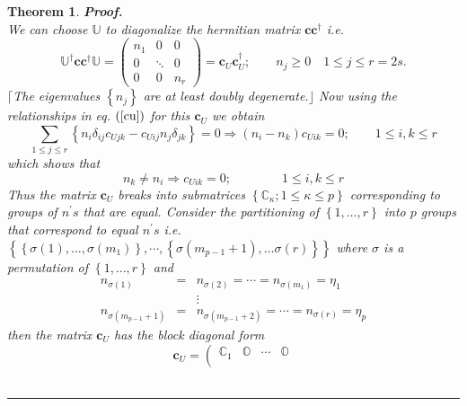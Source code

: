 \documentclass[aps,preprint]{revtex4}
\newtheorem{theorem}{Theorem}
\newenvironment{proof}[1][Proof]{\noindent\textbf{#1.} }{\ \rule{0.5em}{0.5em}}
\begin{document}
\begin{theorem}
\begin{proof}
\begin{equation}
\end{equation}%
We can choose $\mathbb{U}$ to diagonalize the hermitian matrix $\mathbf{cc}%
^{\dagger }$ i.e.%
\begin{equation}
\mathbb{U}^{\dagger }\mathbf{cc}\mathbb{^{\dagger }U}=\left( 
\begin{array}{ccc}
n_{1} & 0 & 0 \\ 
0 & \ddots & 0 \\ 
0 & 0 & n_{r}%
\end{array}%
\right) =\mathbf{c}_{U}\mathbf{c}_{U}^{\dagger };\qquad n_{j}\geq 0\quad
1\leq j\leq r=2s.
\end{equation}%
$\lceil $The eigenvalues $\left\{ n_{j}\right\} $ are at least doubly
degenerate.$\rfloor $ Now using the relationships in eq. $\left( \ref{cu}%
\right) $ for this $\mathbf{c}_{U}$ we obtain%
\begin{equation}
\sum_{1\leq j\leq r}\left\{ n_{i}\delta _{ij}c_{Ujk}-c_{Uij}n_{j}\delta
_{jk}\right\} =0\Rightarrow \left( n_{i}-n_{k}\right) c_{Uik}=0;\qquad 1\leq
i,k\leq r
\end{equation}%
which shows that 
\begin{equation}
n_{k}\neq n_{i}\Rightarrow c_{Uik}=0;\qquad \qquad 1\leq i,k\leq r
\end{equation}%
Thus the matrix $\mathbf{c}_{U}$ breaks into submatrices $\left\{ \mathbb{C}%
_{\kappa };1\leq \kappa \leq p\right\} $ corresponding to groups of $%
n^{\prime }s$ that are equal. Consider the partitioning of $\left\{ 1,\ldots
,r\right\} $ into $p$ groups that correspond to equal $n^{\prime }s$ i.e. $%
\left\{ \left\{ \sigma \left( 1\right) ,\ldots ,\sigma \left( m_{1}\right)
\right\} ,\cdots ,\left\{ \sigma \left( m_{p-1}+1\right) ,\ldots \sigma
\left( r\right) \right\} \right\} $ where $\sigma $ is a permutation of $%
\left\{ 1,\ldots ,r\right\} $ and 
\begin{eqnarray}
n_{\sigma \left( 1\right) } &=&n_{\sigma \left( 2\right) }=\cdots =n_{\sigma
\left( m_{1}\right) }=\eta _{1}  \nonumber \\
&&\vdots  \nonumber \\
n_{\sigma \left( m_{p-1}+1\right) } &=&n_{\sigma \left( m_{p-1}+2\right)
}=\cdots =n_{\sigma \left( r\right) }=\eta _{p}
\end{eqnarray}%
then the matrix $\mathbf{c}_{U}$ has the block diagonal form 
\begin{equation}
\mathbf{c}_{U}=\left( 
\begin{array}{cccc}
\mathbb{C}_{1} & \mathbb{O} & \cdots & \mathbb{O} \\ 

\end{array}
\end{equation}
\end{proof}
\end{theorem}
\end{document}
